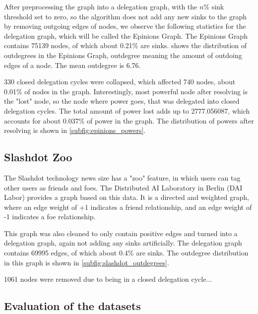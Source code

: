 After preprocessing the graph into a delegation graph, with the $n\%$ sink threshold set to zero, so the algorithm does not add any new sinks to the graph by removing outgoing edges of nodes, we observe the following statistics for the delegation graph, which will be called the Epinions Graph. The Epinions Graph contains 75139 nodes, of which about 0.21\% are sinks.  shows the distribution of outdegrees in the Epinions Graph, outdegree meaning the amount of outdoing edges of a node. The mean outdegree is 6.76.

330 closed delegation cycles were collapsed, which affected 740 nodes, about 0.01\% of nodes in the graph. Interestingly, most powerful node after resolving is the "lost" node, so the node where power goes, that was delegated into closed delegation cycles. The total amount of power lost adds up to 2777.056087, which accounts for about 0.037\% of power in the graph. The distribution of powers after resolving is shown in \cref{subfig:epinions_powers}.

\subsection{Slashdot Zoo}

The Slashdot technology news size has a "zoo" feature, in which users can tag other users as friends and foes. The Distributed AI Laboratory in Berlin (DAI Labor) provides a graph based on this data. \cite{kunegis2009a} It is a directed and weighted graph, where an edge weight of +1 indicates a friend relationship, and an edge weight of -1 indicates a foe relationship.

This graph was also cleaned to only contain positive edges and turned into a delegation graph, again not adding any sinks artificially. The delegation graph contains 69995 edges, of which about 0.4\% are sinks. The outdegree distribution in this graph is shown in \cref{subfig:slashdot_outdegrees}.

1061 nodes were removed due to being in a closed delegation cycle...
 
 \subsection{Evaluation of the datasets}
 \label{subsec:datasets_eval}
 
